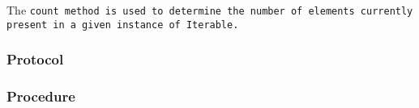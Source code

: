 \def\Subsubsection#1{\subsubsection{#1}
}

The \tt{count} method is used to determine the number of elements
currently present in a given instance of \tt{Iterable}.

\Subsubsection{Protocol}

\Subsubsection{Procedure}
